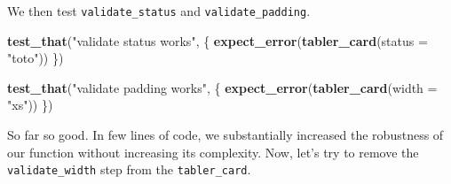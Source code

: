 \documentclass[
]{book}
\newenvironment{Shaded}{\begin{snugshade}}{\end{snugshade}}
\newcommand{\DataTypeTok}[1]{\textcolor[rgb]{0.13,0.29,0.53}{#1}}
\newcommand{\KeywordTok}[1]{\textcolor[rgb]{0.13,0.29,0.53}{\textbf{#1}}}
\newcommand{\NormalTok}[1]{#1}
\newcommand{\StringTok}[1]{\textcolor[rgb]{0.31,0.60,0.02}{#1}}
\begin{document}
We then test \texttt{validate\_status} and \texttt{validate\_padding}.

\begin{Shaded}
\begin{Highlighting}[]
\KeywordTok{test_that}\NormalTok{(}\StringTok{"validate status works"}\NormalTok{, \{}
  \KeywordTok{expect_error}\NormalTok{(}\KeywordTok{tabler_card}\NormalTok{(}\DataTypeTok{status =} \StringTok{"toto"}\NormalTok{))}
\NormalTok{\})}

\KeywordTok{test_that}\NormalTok{(}\StringTok{"validate padding works"}\NormalTok{, \{}
  \KeywordTok{expect_error}\NormalTok{(}\KeywordTok{tabler_card}\NormalTok{(}\DataTypeTok{width =} \StringTok{"xs"}\NormalTok{))}
\NormalTok{\})}
\end{Highlighting}
\end{Shaded}

So far so good. In few lines of code, we substantially increased the robustness of our function without increasing its complexity. Now, let's try to remove the \texttt{validate\_width} step from the \texttt{tabler\_card}.
\end{document}
